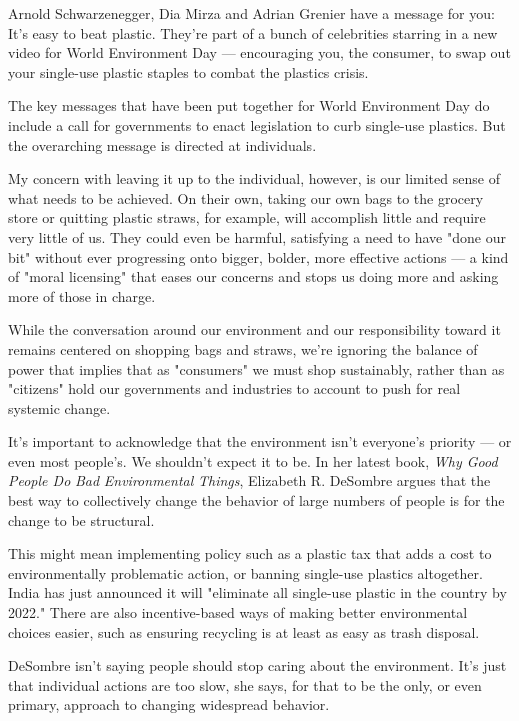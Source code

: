 \documentclass[UTF8,11pt]{ctexart}
\begin{document}
Arnold Schwarzenegger, Dia Mirza and Adrian Grenier have a message for you: It's easy to beat plastic. They're part of a bunch of celebrities starring in a new video for World Environment Day — encouraging you, the consumer, to swap out your single-use plastic staples to combat the plastics crisis.


The key messages that have been put together for World Environment Day do include a call for governments to enact legislation to curb single-use plastics. But the overarching message is directed at individuals.


My concern with leaving it up to the individual, however, is our limited sense of what needs to be achieved. On their own, taking our own bags to the grocery store or quitting plastic straws, for example, will accomplish little and require very little of us. They could even be harmful, satisfying a need to have "done our bit" without ever progressing onto bigger, bolder, more effective actions — a kind of "moral licensing" that eases our concerns and stops us doing more and asking more of those in charge.


While the conversation around our environment and our responsibility toward it remains centered on shopping bags and straws, we're ignoring the balance of power that implies that as "consumers" we must shop sustainably, rather than as "citizens" hold our governments and industries to account to push for real systemic change.


It's important to acknowledge that the environment isn't everyone's priority — or even most people's. We shouldn't expect it to be. In her latest book, \textit{Why Good People Do} \textit{Bad} \textit{Environmental} \textit{Things}, Elizabeth R. DeSombre argues that the best way to collectively change the behavior of large numbers of people is for the change to be structural.


This might mean implementing policy such as a plastic tax that adds a cost to environmentally problematic action, or banning single-use plastics altogether. India has just announced it will "eliminate all single-use plastic in the country by 2022." There are also incentive-based ways of making better environmental choices easier, such as ensuring recycling is at least as easy as trash disposal.


DeSombre isn't saying people should stop caring about the environment. It's just that individual actions are too slow, she says, for that to be the only, or even primary, approach to changing widespread behavior.
\end{document}
